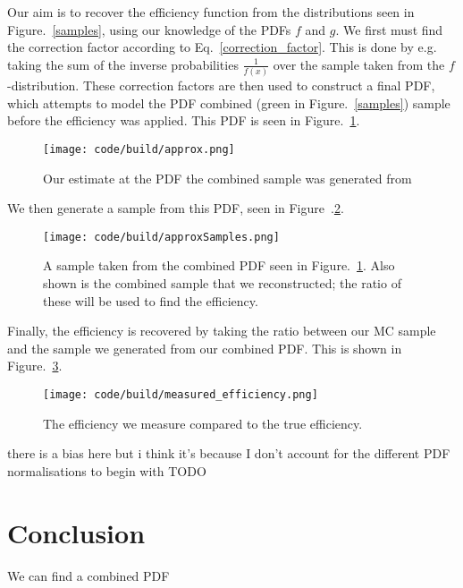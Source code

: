 \documentclass{article}
\begin{document}
Our aim is to recover the efficiency function from the distributions seen in Figure.~\ref{samples}, using our knowledge of the PDFs $f$ and $g$.
We first must find the correction factor according to Eq.~\ref{correction_factor}.
This is done by e.g. taking the sum of the inverse probabilities $\frac{1}{f(x)}$ over the sample taken from the $f$-distribution.
These correction factors are then used to construct a final PDF, which attempts to model the PDF combined (green in Figure.~\ref{samples}) sample before
the efficiency was applied.
This PDF is seen in Figure.~\ref{approx combined pdf}.
\begin{figure}[h!]
    \texttt{[image: code/build/approx.png]}
    \centering
    \caption{Our estimate at the PDF the combined sample was generated from}
    \label{approx combined pdf}
\end{figure}
We then generate a sample from this PDF, seen in Figure~.\ref{sample combined}.
\begin{figure}[h!]
    \texttt{[image: code/build/approxSamples.png]}
    \centering
    \caption{A sample taken from the combined PDF seen in Figure.~\ref{approx combined pdf}.
        Also shown is the combined sample that we reconstructed; the ratio of these will be used to find the efficiency.}
    \label{sample combined}
\end{figure}

Finally, the efficiency is recovered by taking the ratio between our MC sample and the sample we generated from our combined PDF.
This is shown in Figure.~\ref{Measured efficiency}.

\begin{figure}[h!]
    \texttt{[image: code/build/measured\_efficiency.png]}
    \centering
    \caption{The efficiency we measure compared to the true efficiency.}
    \label{Measured efficiency}
\end{figure}

there is a bias here but i think it's because I don't account for the different PDF normalisations to begin with TODO

\section{Conclusion}
We can find a combined PDF
\end{document}
